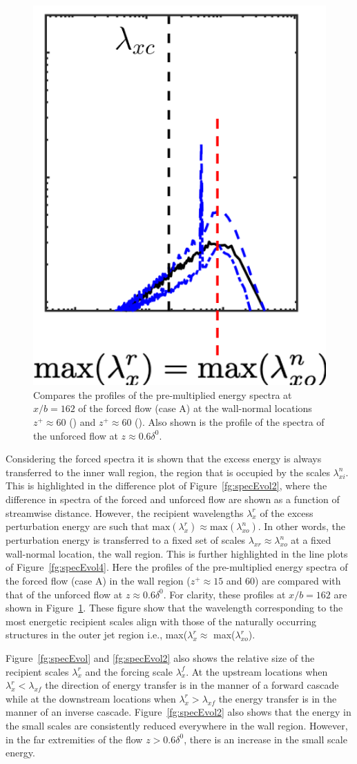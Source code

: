 \begin{figure}[h!]
	\centering
	\includegraphics[width=.35\textwidth]{pics/specEvol4_162.png} \vspace{5pt}
	\caption{Compares the profiles of the pre-multiplied energy spectra at $x/b=162$ of the forced flow (case A) at the wall-normal locations $z^+\approx 60$ (\textcolor{blue}{\chain}) and $z^+\approx 60$ (\textcolor{blue}{\dashed}). Also shown is the profile of the spectra of the unforced flow at $z\approx 0.6 \delta^0$. }
	\label{fg:specEvol4_162}
\end{figure}

Considering the forced spectra it is shown that the excess energy is always transferred to the inner wall region, the region that is occupied by the scales $\lambda_{xi}^n$. This is highlighted in the difference plot of Figure~\ref{fg:specEvol2}, where the difference in spectra of the forced and unforced flow are shown as a function of streamwise distance. However, the recipient wavelengths $\lambda_x^r$ of the excess perturbation energy are such that $\mathrm{max} \left(\lambda_{x}^r \right) \approx \mathrm{max}\left(\lambda_{xo}^n\right)$. In other words, the perturbation energy is transferred to a fixed set of scales $\lambda_{xr} \approx \lambda_{xo}^n$ at a fixed wall-normal location, the wall region. This is further highlighted in the line plots of Figure~\ref{fg:specEvol4}. Here the profiles of the pre-multiplied energy spectra of the forced flow (case A) in the wall region ($z^+\approx 15$ and 60) are compared with that of the unforced flow at $z\approx 0.6 \delta^0$. For clarity, these profiles at $x/b=162$ are shown in Figure~\ref{fg:specEvol4_162}. These figure show that the wavelength corresponding to the most energetic recipient scales align with those of the naturally occurring structures in the outer jet region i.e., max($\lambda_x^r\approx$ max($\lambda_{xo}^r$).   

Figure~\ref{fg:specEvol} and \ref{fg:specEvol2} also shows the relative size of the recipient scales $\lambda_x^r$ and the forcing scale $\lambda_x^f$. At the upstream locations when $\lambda_{x}^r<\lambda_{xf}$ the direction of energy transfer is in the manner of a forward cascade while at the downstream locations when $\lambda_{x}^r>\lambda_{xf}$ the energy transfer is in the manner of an inverse cascade. Figure~\ref{fg:specEvol2} also shows that the energy in the small scales are consistently reduced everywhere in the wall region. However, in the far extremities of the flow $z>0.6 \delta^0$, there is an increase in the small scale energy. 

